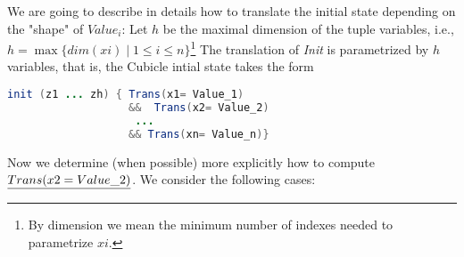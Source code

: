 \documentclass{article}
\theoremstyle{plain}
\numberwithin{equation}{section}
\renewcommand{\leq}{\leqslant}
\begin{document}
We are going to describe in details how to translate the initial state depending on the "shape" of $Value_i$: Let $h$ be the maximal dimension of the tuple variables, i.e., $h=\max\{dim(xi)\mid 1\leq i \leq n\}$\footnote{By dimension we mean the minimum number of indexes needed to parametrize $xi$.} The translation of \emph{Init}  is parametrized by $h$ variables, that is, the Cubicle intial state takes the form 
\begin{lstlisting}[language=java]
init (z1 ... zh) { Trans(x1= Value_1) 
                   &&  Trans(x2= Value_2) 
                    ... 
                   && Trans(xn= Value_n)}
\end{lstlisting}
  Now we determine (when possible) more explicitly  how to compute  $\emph{Trans(x2= Value\_2)}$. We consider the following cases: 
\end{document}
